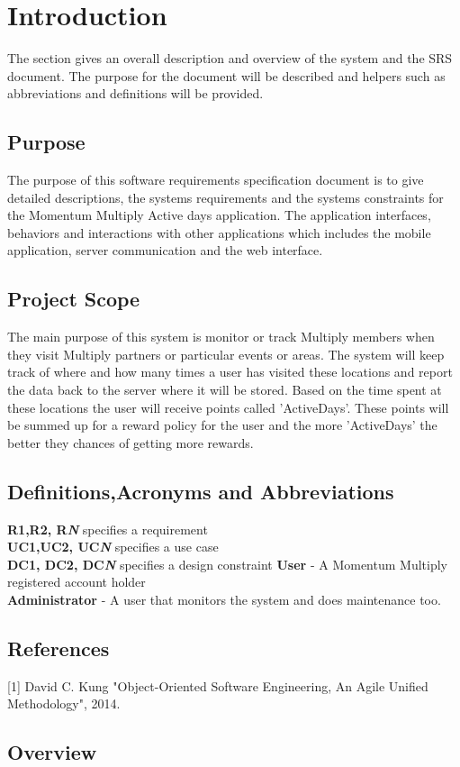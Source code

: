 \documentclass[11pt]{article}
\begin{document}
\newpage
\tableofcontents
\section{Introduction}
The section gives an overall description and overview of the system and the SRS document. The purpose for the document will be described and helpers such as abbreviations and definitions will be provided.
\subsection{Purpose}
The purpose of this software requirements specification document is to give detailed descriptions, the systems requirements and the systems constraints for the Momentum Multiply Active days application. The application interfaces, behaviors and interactions with other applications which includes the mobile application, server communication and the web interface.
\subsection{Project Scope}
The main purpose of this system is monitor or track Multiply members when they visit Multiply partners or particular events or areas. The system will keep track of where and how many times a user has visited these locations and report the data back to the server where it will be stored. Based on the time spent at these locations the user will receive points called 'ActiveDays'. These points will be summed up for a reward policy for the user and the more 'ActiveDays' the better they chances of getting more rewards. 
\subsection{Definitions,Acronyms and Abbreviations}
\textbf{R1,R2, R\textit{N}} specifies a requirement \\
\textbf{UC1,UC2, UC\textit{N}} specifies a use case \\
\textbf{DC1, DC2, DC\textit{N}} specifies a design constraint
\textbf{User} - A Momentum Multiply registered account holder\\
\textbf{Administrator} - A user that monitors the system and does maintenance too.
\subsection{References}
[1] David C. Kung "Object-Oriented Software Engineering, An Agile Unified Methodology", 2014.
\subsection{Overview}
\end{document}
